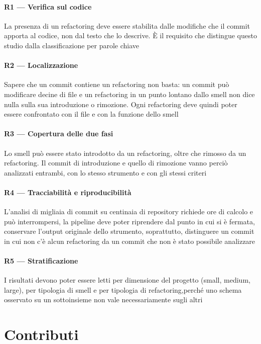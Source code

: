 \paragraph{R1 — Verifica sul codice} La presenza di un refactoring deve essere stabilita dalle modifiche che il commit apporta al codice, non dal testo che lo descrive. È il requisito che distingue questo studio dalla classificazione per parole chiave

\paragraph{R2 — Localizzazione} Sapere che un commit contiene un refactoring non basta: un commit può modificare decine di file e un refactoring in un punto lontano dallo smell non dice nulla sulla sua introduzione o rimozione. Ogni refactoring deve quindi poter essere confrontato con il file e con la funzione dello smell

\paragraph{R3 — Copertura delle due fasi} Lo smell può essere stato introdotto da un refactoring, oltre che rimosso da un refactoring. Il commit di introduzione e quello di rimozione vanno perciò analizzati entrambi, con lo stesso strumento e con gli stessi criteri

\paragraph{R4 — Tracciabilità e riproducibilità} L'analisi di migliaia di commit su centinaia di repository richiede ore di calcolo e può interrompersi, la pipeline deve poter riprendere dal punto in cui si è fermata, conservare l'output originale dello strumento, soprattutto, distinguere un commit in cui non c'è alcun refactoring da un commit che non è stato possibile analizzare

\paragraph{R5 — Stratificazione} I risultati devono poter essere letti per dimensione del progetto (small, medium, large), per tipologia di smell e per tipologia di refactoring,perché uno schema osservato su un sottoinsieme non vale necessariamente sugli altri

\section{Contributi}

